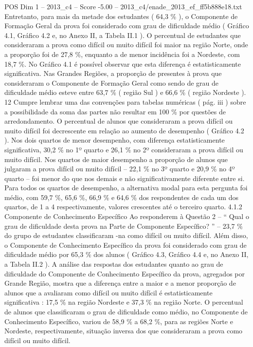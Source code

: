 \begin{textsample}{POS Dim 1 – 2013\_c4 – Score -5.00 – 2013\_c4/enade\_2013\_ef\_ff5b888e18.txt}
Entretanto, para mais da metade dos estudantes ( 64,3 \% ), o Componente de Formação Geral da prova foi considerado com grau de dificuldade médio ( Gráfico 4.1, Gráfico 4.2 e, no Anexo II, a Tabela II.1 ).
O percentual de estudantes que consideraram a prova como difícil ou muito difícil foi maior na região Norte, onde a proporção foi de 27,8 \%, enquanto a de menor incidência foi a Nordeste, com 18,7 \%.
No Gráfico 4.1 é possível observar que esta diferença é estatisticamente significativa.
Nas Grandes Regiões, a proporção de presentes à prova que consideraram o Componente de Formação Geral como sendo de grau de dificuldade médio esteve entre 63,7 \% ( região Sul ) e 66,6 \% ( região Nordeste ). 12 Cumpre lembrar uma das convenções para tabelas numéricas ( pág. iii ) sobre a possibilidade da soma das partes não resultar em 100 \% por questões de arredondamento.
O percentual de alunos que consideraram a prova difícil ou muito difícil foi decrescente em relação ao aumento de desempenho ( Gráfico 4.2 ).
Nos dois quartos de menor desempenho, com diferença estatisticamente significativa, 30,2 \% no 1º quarto e 26,1 \% no 2º consideraram a prova difícil ou muito difícil.
Nos quartos de maior desempenho a proporção de alunos que julgaram a prova difícil ou muito difícil – 22,1 \% no 3º quarto e 20,9 \% no 4º quarto – foi menor do que nos demais e não significativamente diferente entre si.
Para todos os quartos de desempenho, a alternativa modal para esta pergunta foi médio, com 59,7 \%, 65,6 \%, 66,9 \% e 64,6 \% dos respondentes de cada um dos quartos, de 1 a 4 respectivamente, valores crescentes até o terceiro quarto. 4.1.2 Componente de Conhecimento Específico Ao responderem à Questão 2 – “ Qual o grau de dificuldade desta prova na Parte de Componente Específico? ” – 23,7 \% do grupo de estudantes classificaram -na como difícil ou muito difícil.
Além disso, o Componente de Conhecimento Específico da prova foi considerado com grau de dificuldade médio por 65,3 \% dos alunos ( Gráfico 4.3, Gráfico 4.4 e, no Anexo II, a Tabela II.2 ).
A análise das respostas dos estudantes quanto ao grau de dificuldade do Componente de Conhecimento Específico da prova, agregados por Grande Região, mostra que a diferença entre a maior e a menor proporção de alunos que a avaliaram como difícil ou muito difícil é estatisticamente significativa : 17,5 \% na região Nordeste e 37,3 \% na região Norte.
O percentual de alunos que classificaram o grau de dificuldade como médio, no Componente de Conhecimento Específico, variou de 58,9 \% a 68,2 \%, para as regiões Norte e Nordeste, respectivamente, situação inversa dos que consideraram a prova como difícil ou muito difícil.

\end{textsample}
